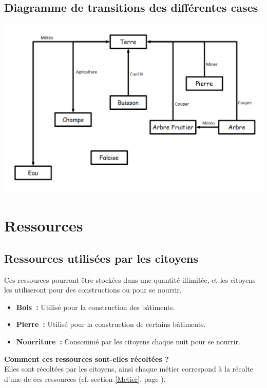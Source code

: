 \documentclass[a4paper]{article}
\newcommand{\alinea}{\hspace*{0.5cm}}
\begin{document}
      \subsection{Diagramme de transitions des différentes cases}
        \label{DiagCase}
        \begin{center}
          \includegraphics[scale=0.35]{DiagrammeTransitionCases.png} 
        \end{center}
        
    \section{Ressources}
      \subsection{Ressources utilisées par les citoyens}
        \alinea Ces ressources pourront être stockées dans une quantité illimitée, et les citoyens les utiliseront pour des constructions ou pour se nourrir.
        \begin{itemize} \small
          \item \textbf{Bois :} Utilisé pour la construction des bâtiments.
          \item \textbf{Pierre :} Utilisé pour la construction de certains bâtiments.
          \item \textbf{Nourriture :} Consommé par les citoyens chaque nuit pour se nourrir.
        \end{itemize} \normalsize
        \textbf{Comment ces ressources sont-elles récoltées ? }\\
        \alinea Elles sont récoltées par les citoyens, ainsi chaque métier correspond à la récolte d'une de ces ressources (cf. section \ref{Metier}, page \pageref{Metier}).
\end{document}
